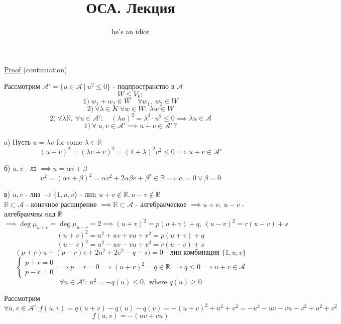\documentclass[a4paper]{article}
\begin{document}
\title{ОСА. Лекция}
\author{he's an idiot}
\maketitle

\begin{tcolorbox}
\underline{Proof} (continuation)

Рассмотрим $ \mathcal{A}' = \{ u \in \mathcal{A} \ | \ u^2 \leq 0 \} $ - подпространство
в $ \mathcal{A} $ 
\[
    W \leq V_k:
\]
\[
    1)\  w_1 + w_2 \in W \quad \forall w_1, \ w_2 \in W
\]
\[
    2) \ \forall \lambda \in K \ \forall w \in W: \ \lambda w \in W
\]
\[
    2) \ \forall \lambda \mathbb{R}, \ \forall u \in \mathcal{A}' : \quad
    (\lambda u)^2 = \lambda^2 \cdot u^2 \leq 0 \implies \lambda u \in \mathcal{A}
\]
\[
    1) \ \forall \ u,v \in \mathcal{A}' \implies u + v \in \mathcal{A}' \, ?
\]

a) Пусть $ u = \lambda v $ for some $ \lambda \in \mathbb{R} $ 
\[
    (u + v)^2 = (\lambda v + v)^2 = (1 + \lambda)^2 v^2 \leq 0 \implies u + v \in
    \mathcal{A}'
\]

б) $ u,v $ - лз $ \implies u = \alpha v + \beta $ 
\[
    u^2 = (\alpha v + \beta)^2 = \alpha v^2 + 2 \alpha \beta v + \beta^2 \in \mathbb{R}
    \implies \alpha = 0 \lor \beta = 0
\]

в) $ u, v $ - лнз $ \rightarrow \{ 1, u, v \} $ - лнз; $ u + v \notin \mathbb{R},
u - v \notin \mathbb{R}$\\
$ \mathbb{R} \subset \mathcal{A} $ - конечное расширение $ \implies \mathbb{R} \subset 
\mathcal{A} $ - алгебраическое $ \implies u + v, \ u - v $ - алгебраичны над $ \mathbb{R} $ 
$ \implies \deg \mu_{u+v} = \deg \mu_{u-v} = 2 \implies (u+v)^2 = p(u+v) + q, \ 
(u-v)^2 = r(u-v)+s$ 
\[
    (u + v)^2 = u^2 + uv + vu + v^2 = p(u+v) + q
\]
\[
    (u - v)^2 = u^2 - uv - vu + v^2 = r(u-v) + s
\]
\[
    (p+r)u + (p-r)v + 2u^2 + 2v^2 - q - s) = 0 \text{ - лин комбинация } \{ 1, u, v \}
\]
\[
    \begin{cases}
        p + r = 0\\
        p - r = 0
    \end{cases}
    \implies p = r = 0 \implies (u+v)^2 = q \in \mathbb{R} \implies q \leq 0 \implies
    u + v \in \mathcal{A}
\]
\[
    \forall u \in \mathcal{A}': \ u^2 = -q(u) \leq 0, \text{ where } q(u) \geq 0
\]

Рассмотрим $ \forall u,v \in \mathcal{A}': f(u,v) = q(u+v) - q(u) - q(v) = 
-(u+v)^2 + u^2 + v^2 = -u^2 - uv -vu - v^2 + u^2 + v^2 $ 
\[
    f(u,v) = -(uv + vu)
\]


\end{tcolorbox}
\end{document}

